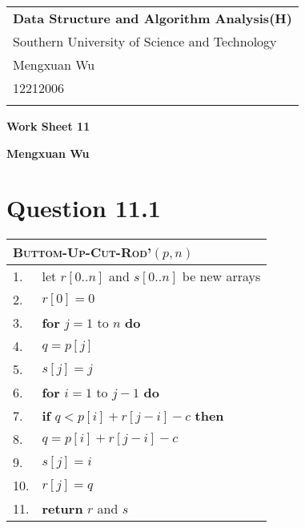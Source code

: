 \documentclass[a4paper,12pt]{article}
\begin{document}
\thispagestyle{empty} %

\begin{tabular}{p{15.5cm}}
{\large \bf Data Structure and Algorithm Analysis(H)} \\
Southern University of Science and Technology \\ Mengxuan Wu \\ 12212006 \\
\hline
\\
\end{tabular}

\vspace*{0.3cm} %

\begin{center}
	{\Large \bf Work Sheet 11}
	\vspace{2mm}

	{\bf Mengxuan Wu}
		
\end{center}  

\vspace{0.4cm}

\section*{Question 11.1}

\begin{center}
	\begin{tabular}{ll}
		\toprule
		\multicolumn{2}{l}{\textsc{Buttom-Up-Cut-Rod'}$(p,n)$} \\
		\midrule
		1. & let $r[0..n]$ and $s[0..n]$ be new arrays \\
		2. & $r[0] = 0$ \\
		3. & \textbf{for} $j = 1$ to $n$ \textbf{do} \\
		4. & \qquad $q = p[j]$ \\
		5. & \qquad $s[j] = j$ \\
		6. & \qquad \textbf{for} $i = 1$ to $j-1$ \textbf{do} \\
		7. & \qquad \qquad \textbf{if} $q < p[i] + r[j-i] - c$ \textbf{then} \\
		8. & \qquad \qquad \qquad $q = p[i] + r[j-i] - c$ \\
		9. & \qquad \qquad \qquad $s[j] = i$ \\
		10. & \qquad $r[j] = q$ \\
		11. & \textbf{return} $r$ and $s$ \\
		\bottomrule
	\end{tabular}
\end{center}
\end{document}
